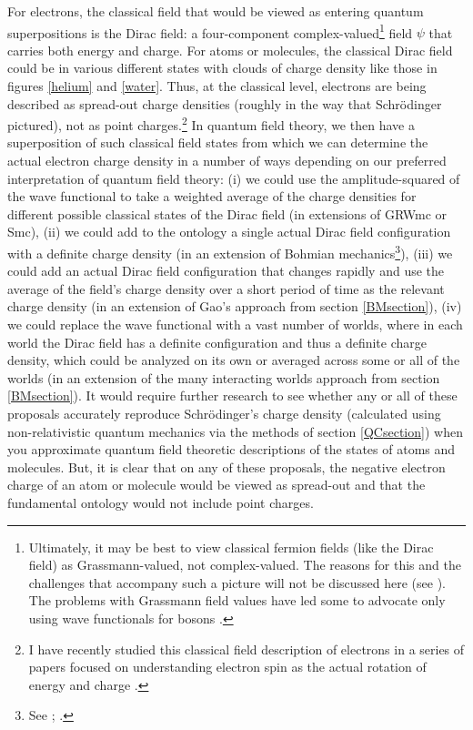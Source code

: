 \documentclass[onecolumn,secnumarabic,amsmath,amssymb,balancelastpage,nofootinbib]{article}
\begin{document}
For electrons, the classical field that would be viewed as entering quantum superpositions is the Dirac field: a four-component complex-valued\footnote{Ultimately, it may be best to view classical fermion fields (like the Dirac field) as Grassmann-valued, not complex-valued.  The reasons for this and the challenges that accompany such a picture will not be discussed here (see \cite{floreanini1988, jackiw1990, hatfield, valentini1992, valentini1996, struyve2010, struyve2011, positrons}).  The problems with Grassmann field values have led some to advocate only using wave functionals for bosons \cite{bohm1987, bohmhiley}.} field $\psi$ that carries both energy and charge.  For atoms or molecules, the classical Dirac field could be in various different states with clouds of charge density like those in figures \ref{helium} and \ref{water}.  Thus, at the classical level, electrons are being described as spread-out charge densities (roughly in the way that Schr\"{o}dinger pictured), not as point charges.\footnote{I have recently studied this classical field description of electrons in a series of papers focused on understanding electron spin as the actual rotation of energy and charge \cite{howelectronsspin, smallelectronstates, positrons, electronsspinmeasurement}.}  In quantum field theory, we then have a superposition of such classical field states from which we can determine the actual electron charge density in a number of ways depending on our preferred interpretation of quantum field theory: (i) we could use the amplitude-squared of the wave functional to take a weighted average of the charge densities for different possible classical states of the Dirac field (in extensions of GRWmc or Smc), (ii) we could add to the ontology a single actual Dirac field configuration with a definite charge density (in an extension of Bohmian mechanics\footnote{See \cite[ch.\ 4]{valentini1992}; \cite{valentini1996, struyve2010, struyve2011}.}), (iii) we could add an actual Dirac field configuration that changes rapidly and use the average of the field's charge density over a short period of time as the relevant charge density (in an extension of Gao's approach from section \ref{BMsection}), (iv) we could replace the wave functional with a vast number of worlds, where in each world the Dirac field has a definite configuration and thus a definite charge density, which could be analyzed on its own or averaged across some or all of the worlds (in an extension of the many interacting worlds approach from section \ref{BMsection}).  It would require further research to see whether any or all of these proposals accurately reproduce Schr\"{o}dinger's charge density (calculated using non-relativistic quantum mechanics via the methods of section \ref{QCsection}) when you approximate quantum field theoretic descriptions of the states of atoms and molecules.  But, it is clear that on any of these proposals, the negative electron charge of an atom or molecule would be viewed as spread-out and that the fundamental ontology would not include point charges.
\end{document}
